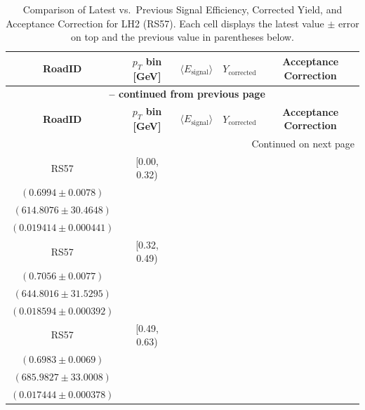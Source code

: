 {\footnotesize
\renewcommand{\arraystretch}{1.35}
\begin{longtable}{|c|c|c|c|c|}
\caption{Comparison of Latest vs.\ Previous Signal Efficiency, Corrected Yield, and Acceptance Correction for LH2 (RS57). Each cell displays the latest value $\pm$ error on top and the previous value in parentheses below.} \label{tab:eff_acc_comp_LH2_RS57} \\
\hline
\textbf{RoadID} & \textbf{$p_{T}$ bin [GeV]} & \textbf{$\langle E_{\mathrm{signal}} \rangle$} & \textbf{$Y_{\mathrm{corrected}}$} & \textbf{Acceptance Correction} \\
\hline
\endfirsthead
\multicolumn{5}{c}{{\bfseries \tablename\ \thetable{} -- continued from previous page}} \\
\hline
\textbf{RoadID} & \textbf{$p_{T}$ bin [GeV]} & \textbf{$\langle E_{\mathrm{signal}} \rangle$} & \textbf{$Y_{\mathrm{corrected}}$} & \textbf{Acceptance Correction} \\
\hline
\endhead
\hline \multicolumn{5}{|r|}{{Continued on next page}} \\ \hline
\endfoot
\hline
\endlastfoot
RS57 & [0.00, 0.32) & \begin{tabular}{@{}c@{}}$0.7254 \pm 0.0078$ \\ $(0.6994 \pm 0.0078)$\end{tabular} & \begin{tabular}{@{}c@{}}$592.7504 \pm 29.3719$ \\ $(614.8076 \pm 30.4648)$\end{tabular} & \begin{tabular}{@{}c@{}}$0.017079 \pm 0.000772$ \\ $(0.019414 \pm 0.000441)$\end{tabular} \\ \hline
RS57 & [0.32, 0.49) & \begin{tabular}{@{}c@{}}$0.7226 \pm 0.0081$ \\ $(0.7056 \pm 0.0077)$\end{tabular} & \begin{tabular}{@{}c@{}}$629.6391 \pm 30.7881$ \\ $(644.8016 \pm 31.5295)$\end{tabular} & \begin{tabular}{@{}c@{}}$0.015731 \pm 0.000676$ \\ $(0.018594 \pm 0.000392)$\end{tabular} \\ \hline
RS57 & [0.49, 0.63) & \begin{tabular}{@{}c@{}}$0.7056 \pm 0.0084$ \\ $(0.6983 \pm 0.0069)$\end{tabular} & \begin{tabular}{@{}c@{}}$678.8519 \pm 32.6578$ \\ $(685.9827 \pm 33.0008)$\end{tabular} & \begin{tabular}{@{}c@{}}$0.015673 \pm 0.000671$ \\ $(0.017444 \pm 0.000378)$\end{tabular} \\ \hline

\end{longtable}}
